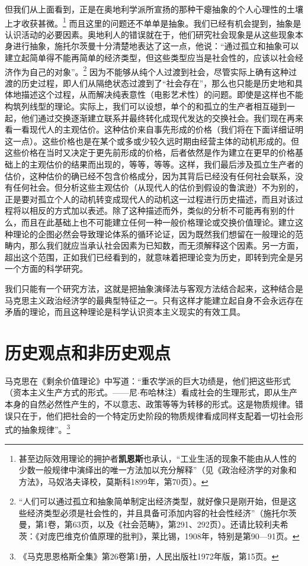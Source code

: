 \documentclass[fontset=fandol, a4paper, 12pt, openright]{ctexbook}
\begin{document}
但我们从上面看到，正是在奥地利学派所宣扬的那种干瘪抽象的个人心理性的土壤上才收获甚微。\footnote{甚至边际效用理论的拥护者\textbf{凯恩斯}也承认，“工业生活的现象不能由从人性的少数一般规律中演绎出的唯一方法加以充分解释”（见《政治经济学的对象和方法》，马奴洛夫译校，莫斯科1899年，第70页）。} 而且这里的问题还不单单是抽象。我们已经有机会提到，抽象是认识活动的必要因素。奥地利人的错误就在于，他们研究社会现象是从这些现象本身进行抽象，施托尔茨曼十分清楚地表达了这一点，他说：“通过孤立和抽象可以建立起简单得不能再简单的经济类型，但这些类型应当是社会性的，应该以社会经济作为自己的对象”。\footnote{“人们可以通过孤立和抽象简单制定出经济类型，就好像只是刚开始，但是这些经济类型必须是社会性的，并且具备可添加内容的社会性经济”（施托尔茨曼，第1卷，第63页，以及《社会范畴》，第291、292页）。还请比较利夫希茨：《对庞巴维克价值原理的批判》，莱比锡，1908年，特别是第90—91页。} 因为不能够从纯个人过渡到社会，尽管实际上确有这种过渡的历史过程，即人们从隔绝状态过渡到了“社会存在”，那么也只能是历史地和具体地描述这个过程，从而解决纯表意性（电影艺术性）的问题。即使是这样也不能构筑列线型的理论。实际上，我们可以设想，单个的和孤立的生产者相互碰到一起，他们通过交换逐渐建立联系并最终转化成现代发达的交换社会。我们现在再来看一看现代人的主观估价。这种估价来自事先形成的价格（我们将在下面详细证明这一点）。这些价格也是在某个或多或少较久远时期由经营主体的动机形成的。但这些价格在当时又决定于更先前形成的价格，后者依然是作为建立在更早的价格基础上的主观估价的结果而出现的，等等，等等。这样，我们最后涉及孤立生产者的估价，这种估价的确已经不包含价格成分，因为其背后已经没有任何社会联系，没有任何社会。但分析这些主观估价（从现代人的估价到假设的鲁滨逊）不为别的，正是要对孤立个人的动机转变成现代人的动机这一过程进行历史描述，而且对该过程将以相反的方式加以表述。除了这种描述而外，类似的分析不可能再有别的什么，而且在此基础上也不可能建立任何一种一般价格理论或交换价值理论。建立这种理论的企图必然会导致理论体系的循环论证，因为既然我们想留在一般理论的范畴内，那么我们就应当承认社会因素为已知数，而无须解释这个因素。另一方面，超出这个范围，正如我们已经看到的，就意味着把理论变为历史，即转到完全是另一个方面的科学研究。

我们只能有一个研究方法，这就是把抽象演绎法与客观方法结合起来，这种结合是马克思主义政治经济学的最典型特征之一。只有这样才能建立起自身不会永远存在矛盾的理论，而且这种理论是科学认识资本主义现实的有效工具。

\section{历史观点和非历史观点}

马克思在《剩余价值理论》中写道：“重农学派的巨大功绩是，他们把这些形式（资本主义生产方式的形式。——尼$\cdot$布哈林注）看成社会的生理形式，即从生产本身的自然必然性产生的，不以意志、政策等等为转移的形式。这是物质规律。错误只在于，他们把社会的一个特定历史阶段的物质规律看成同样支配着一切社会形式的抽象规律”。\footnote{《马克思恩格斯全集》第26卷第1册，人民出版社1972年版，第15页。}
\end{document}
